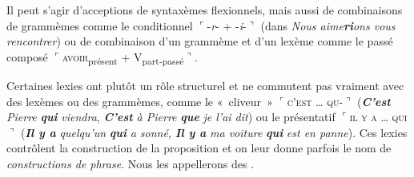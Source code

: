 Il peut s’agir d’acceptions de syntaxèmes flexionnels, mais aussi de combinaisons de grammèmes comme le conditionnel  $⌜${}-\textit{r}{}- + -\textit{i}{}-$⌝$ (dans \textit{Nous aime}\textbf{\textit{ri}}\textit{ons vous rencontrer}) ou de combinaison d’un grammème et d’un lexème comme le passé composé $⌜$\textsc{avoir}\textsubscript{présent} + V\textsubscript{part-passé}$⌝$.

Certaines lexies ont plutôt un rôle structurel et ne commutent pas vraiment avec des lexèmes ou des grammèmes, comme le «~cliveur~» $⌜$\textsc{c’est} \textsc{…} \textsc{qu-}$⌝$ (\textbf{\textit{C’est}} \textit{Pierre} \textbf{\textit{qui}} \textit{viendra}, \textit{\textbf{C’est} à Pierre} \textbf{\textit{que}} \textit{je l’ai dit}) ou le présentatif $⌜$\textsc{il} \textsc{y} \textsc{a} \textsc{…} \textsc{qui}$⌝$ (\textbf{\textit{Il y a}} \textit{quelqu’un} \textbf{\textit{qui}} \textit{a sonné,} \textbf{\textit{Il y a}} \textit{ma voiture} \textbf{\textit{qui}} \textit{est en panne}). Ces lexies contrôlent la construction de la proposition et on leur donne parfois le nom de \textit{constructions de phrase}. Nous les appellerons des .\largerpage

